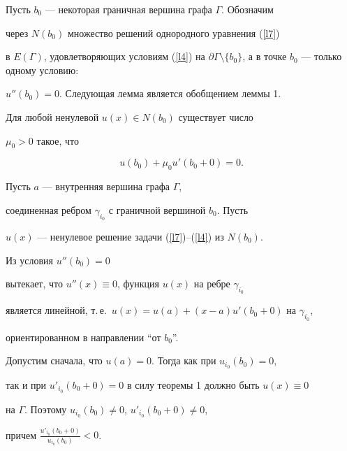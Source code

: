 {{{{{{{Пусть $b_0$ --- некоторая граничная вершина графа $\Gamma$. Обозначим


через $N(b_0)$ множество решений однородного уравнения (\ref{l7})


в $E(\Gamma)$, удовлетворяющих условиям (\ref{l4}) на $\partial \Gamma


\setminus \{b_0\}$, а в точке $b_0$ --- только одному условию:


$u''(b_0)=0$. Следующая лемма является обобщением леммы 1.





\begin{lem}


Для любой ненулевой $u(x)\in N(b_0)$ существует число


$\mu_0>0$ такое, что


\begin{equation}


\label{l16}


u(b_0)+\mu_0 u'(b_0+0)=0.


\end{equation}


\end{lem}





\begin{pf} Пусть $a$ --- внутренняя вершина графа $\Gamma$,


соединенная ребром $\gamma_{i_0}$ с граничной вершиной $b_0$. Пусть


$u(x)$ --- ненулевое решение задачи (\ref{l7})--(\ref{l4}) из $N(b_0)$.


Из условия $u''(b_0)=0$


вытекает, что $u''(x)\equiv 0$, функция $u(x)$ на ребре $\gamma_{i_0}$


является линейной, т.\,е.~$u(x)=u(a)+(x-a)u'(b_0+0)$ на $\gamma_{i_0}$,


ориентированном в направлении ``от $b_0$''.





Допустим сначала, что $u(a)=0$. Тогда как при $u_{i_0}(b_0)=0$,


так и при $u'_{i_0}(b_0+0)=0$ в силу теоремы 1 должно быть $u(x)\equiv 0$


на $\Gamma$. Поэтому $u_{i_0}(b_0)\ne 0$, $u'_{i_0}(b_0+0)\ne 0$,


причем $\frac{u'_{i_0}(b_0+0)}{u_{i_0}(b_0)}<0$.






\end{pf}}}}}}}}
